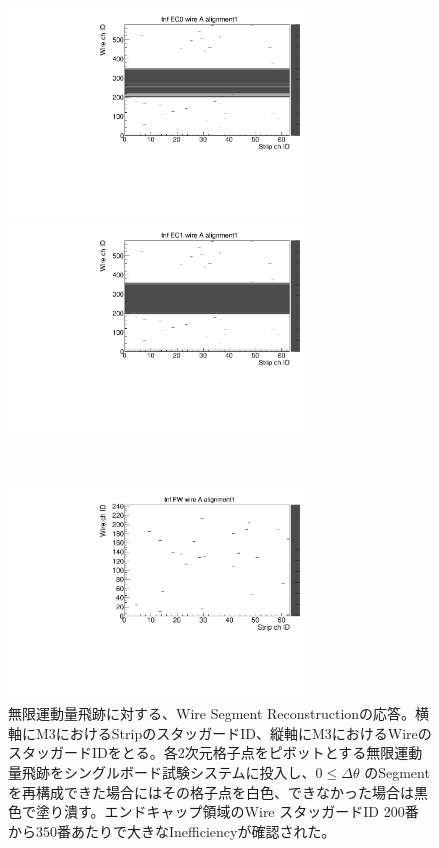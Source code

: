 \begin{figure}
    \begin{minipage}[b]{.5\linewidth}
        \centering
        \includegraphics[height=5.6cm]{fig/Test/B_InfEC0_wire.pdf}
    \end{minipage}
    \begin{minipage}[b]{.5\linewidth}
        \centering
        \includegraphics[height=5.6cm]{fig/Test/B_InfEC1_wire.pdf}
    \end{minipage}\\
    \begin{minipage}[b]{\linewidth}
        \centering
        \includegraphics[height=5.6cm]{fig/Test/B_InfFW_wire.pdf}
    \end{minipage}
    \caption[無限運動量飛跡に対する、Wire Segment Reconstructionの応答]{無限運動量飛跡に対する、Wire Segment Reconstructionの応答。横軸にM3におけるStripのスタッガードID、縦軸にM3におけるWireのスタッガードIDをとる。各2次元格子点をピボットとする無限運動量飛跡をシングルボード試験システムに投入し、$0 \leq \Delta\theta$ のSegmentを再構成できた場合にはその格子点を白色、できなかった場合は黒色で塗り潰す。エンドキャップ領域のWire スタッガードID 200番から350番あたりで大きなInefficiencyが確認された。}
    \label{Inf_B_Wire}
\end{figure}

